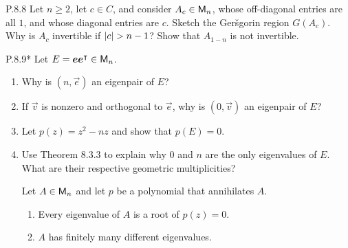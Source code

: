 \documentclass{../homework}
\date{Tuesday 3/12}
\author{}
\begin{document}
\begin{problems}
\item[P.8.8] Let \(n \ge 2\), let \(c \in C\), and consider
  \(A_c \in \mathsf{M}_n\), whose off-diagonal entries are all \(1\), and
  whose diagonal entries are \(c\).  Sketch the Ger\v sgorin region
  \(G(A_c)\).  Why is \(A_c\) invertible if \(\lvert {c} \rvert > n - 1\)?  Show
  that \(A_{1-n}\) is not invertible.

  \begin{solution}

  \end{solution}

\item[P.8.9*] Let \(E = \vec e \vec e^\transpose \in \M_n\).
  \begin{enumerate}
  \item Why is \((n, \vec e)\) an eigenpair of \(E\)?

    \begin{solution}

    \end{solution}

  \item If \(\vec v\) is nonzero and orthogonal to \(\vec e\), why is
    \((0, \vec v)\) an eigenpair of \(E\)?

    \begin{solution}

    \end{solution}

  \item Let \(p(z) = z^2 - nz\) and show that \(p(E) = 0\).

    \begin{solution}

    \end{solution}

  \item Use Theorem 8.3.3 to explain why \(0\) and \(n\) are the only
    eigenvalues of \(E\).  What are their respective geometric
    multiplicities?
    \begin{booktheorem}[8.3.3]
      Let \(A \in \mathsf{M}_n\) and let \(p\) be a polynomial that
      annihilates \(A\).
      \begin{enumerate}
      \item Every eigenvalue of \(A\) is a root of \(p(z) = 0\).
      \item \(A\) has finitely many different eigenvalues.
      \end{enumerate}
    \end{booktheorem}


\end{enumerate}
\end{problems}
\end{document}
